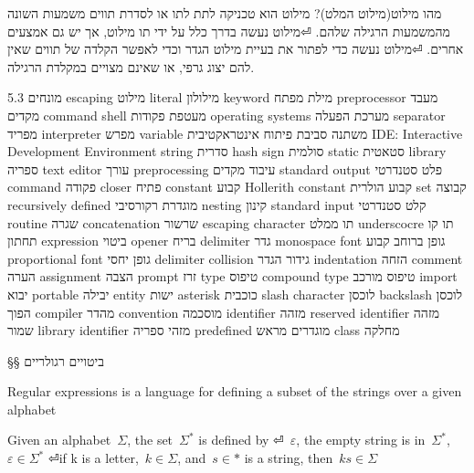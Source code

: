 \begin{טבלא}[!htbp]
        מהו מילוט(מילוט המלט)?
        מילוט הוא טכניקה לתת לתו או לסדרת תווים משמעות השונה מהמשמעות הרגילה שלהם.
⏎מילוט נעשה בדרך כלל על ידי תו מילוט, אך יש גם אמצעים אחרים.
⏎מילוט נעשה כדי לפתור את בעיית מילוט הגדר וכדי לאפשר הקלדה של תווים שאין להם יצוג גרפי, או שאינם מצויים במקלדת הרגילה.

        5.3 מונחים
        escaping מילוט
        literal מילולון
        keyword מילת מפתח
        preprocessor מעבד מקדים
        command shell מעטפת פקודות
        operating systems מערכת הפעלה
        separator מפריד
        interpreter מפרש
        variable משתנה
        סביבת פיתוח אינטראקטיבית
        IDE: Interactive Development Environment
        string סדרית
        hash sign סולמית
        static סטאטית
        library ספריה
        text editor עורך
        preprocessing עיבוד מקדים
        standard output פלט סטנדרטי
        command פקודה
        closer פתיח
        constant קבוע
        Hollerith constant קבוע הולרית
        set קבוצה
        recursively defined מוגדרת רקורסיבי
        nesting קינון
        standard input קלט סטנדרטי
        routine שגרה
        concatenation שרשור
        escaping character תו ממלט
        underscocre תו קו תחתון
        expression ביטוי
        opener בריח
        delimiter גדר
        monospace font גופן ברוחב קבוע
        proportional font גופן יחסי
        delimiter collision גידור הגדר
        indentation הזחה
        comment הערה
        assignment הצבה
        prompt זרז
        type טיפוס
        compound type טיפוס מורכב
        import יבוא
        portable יבילה
        entity ישות
        asterisk כוכבית
        slash character לוכסן
        backslash לוכסן הפוך
        compiler מהדר
        convention מוסכמה
        identifier מזהה
        reserved identifier מזהה שמור
        library identifier מזהי ספריה
        predefined מוגדרים מראש
        class מחלקה

§§ ביטויים רגולריים

        Regular expressions is a language for defining a subset of the strings
        over a given alphabet

        Given an alphabet~$Σ$, the set~$Σ^*$ is defined by
⏎~$ε$, the empty string is in~$Σ^*$,~$ε∈Σ^*$
⏎if k is a letter,~$k∈Σ$, and~$s∈*$ is a string, then~$ks∈Σ$


\end{טבלא}
